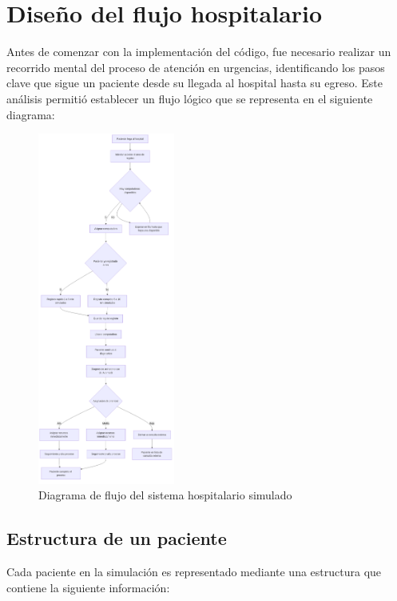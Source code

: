\documentclass{article}
\begin{document}
\section{Diseño del flujo hospitalario}

Antes de comenzar con la implementación del código, fue necesario realizar un recorrido mental del proceso de atención en urgencias, identificando los pasos clave que sigue un paciente desde su llegada al hospital hasta su egreso. Este análisis permitió establecer un flujo lógico que se representa en el siguiente diagrama:

\begin{figure}[H]
    \centering
    \includegraphics[width=0.4\textwidth]{flujo_hospital.png}
    \caption{Diagrama de flujo del sistema hospitalario simulado}
\end{figure}

\newpage

\subsection{Estructura de un paciente}

Cada paciente en la simulación es representado mediante una estructura que contiene la siguiente información:
\end{document}
